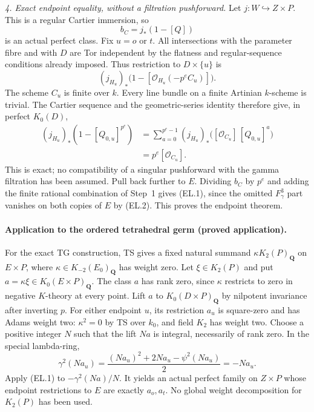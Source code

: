 \emph{4. Exact endpoint equality, without a filtration pushforward.}
Let $j:W\hookrightarrow Z\times P$.  This is a regular Cartier
immersion, so
\[
                         b_C=j_*(1-[Q])
\]
is an actual perfect class.  Fix $u=o$ or $t$.  All intersections
with the parameter fibre and with $D$ are Tor independent by the
flatness and regular-sequence conditions already imposed.  Thus
restriction to $D\times\{u\}$ is
\[
       (j_{H_u})_*\bigl(1-[\mathcal O_{H_u}(-p^e C_u)]\bigr).
\]
The scheme $C_u$ is finite over $k$.  Every line bundle on a finite
Artinian $k$-scheme is trivial.  The Cartier sequence and the
geometric-series identity therefore give, in perfect $K_0(D)$,
\begin{align*}
 (j_{H_u})_*(1-[Q_{0,u}]^{p^e})
 &=\sum_{a=0}^{p^e-1}(j_{H_u})_*
                   \bigl([\mathcal O_{C_u}]\,[Q_{0,u}]^a\bigr)\\
 &=p^e[\mathcal O_{C_u}].
\end{align*}
This is exact; no compatibility of a singular pushforward with
the gamma filtration has been assumed.  Pull back further to $E$.
Dividing $b_C$ by $p^e$ and adding the finite rational combination
of Step~1 gives (EL.1), since the omitted $F_\gamma^3$ part vanishes
on both copies of $E$ by (EL.2).  This proves the endpoint
theorem.

\paragraph{Application to the ordered tetrahedral germ
(proved application).}
For the exact TG construction, TS gives a fixed natural summand
$\kappa K_2(P)_{\mathbf Q}$ on $E\times P$, where
$\kappa\in K_{-2}(E_0)_{\mathbf Q}$ has weight zero.  Let
$\xi\in K_2(P)$ and put $a=\kappa\xi\in K_0(E\times P)_{\mathbf Q}$.
The class $a$ has rank zero, since $\kappa$ restricts to zero in
negative $K$-theory at every point.  Lift $a$ to
$K_0(D\times P)_{\mathbf Q}$ by nilpotent invariance
after inverting $p$\citep[Theorem A]{rootGeisserHesselholt2011}.
For either endpoint $u$, its restriction $a_u$ is square-zero and
has Adams weight two: $\kappa^2=0$ by TS over $k_0$, and field
$K_2$ has weight two.  Choose a positive integer $N$ such that the
lift $Na$ is integral, necessarily of rank zero.  In the special lambda-ring,
\[
 \gamma^2(Na_u)
   =\frac{(Na_u)^2+2Na_u-\psi^2(Na_u)}2=-Na_u.
\]
Apply (EL.1) to $-\gamma^2(Na)/N$.  It yields an actual perfect
family on $Z\times P$ whose endpoint restrictions to $E$ are
exactly $a_o,a_t$.  No global weight decomposition for $K_2(P)$
has been used.

